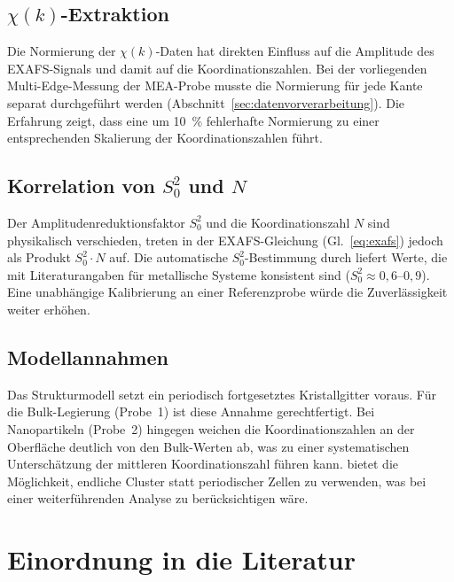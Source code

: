 \subsection{$\chi(k)$-Extraktion}

Die Normierung der $\chi(k)$-Daten hat direkten Einfluss auf die
Amplitude des EXAFS-Signals und damit auf die Koordinationszahlen.
Bei der vorliegenden Multi-Edge-Messung der MEA-Probe musste die
Normierung für jede Kante separat durchgeführt werden
(Abschnitt~\ref{sec:datenvorverarbeitung}).
Die Erfahrung zeigt, dass eine um \SI{10}{\percent} fehlerhafte
Normierung zu einer entsprechenden Skalierung der
Koordinationszahlen führt.

\subsection{Korrelation von $S_0^2$ und $N$}

Der Amplitudenreduktionsfaktor $S_0^2$ und die Koordinationszahl $N$
sind physikalisch verschieden, treten in der EXAFS-Gleichung
(Gl.~\eqref{eq:exafs}) jedoch als Produkt $S_0^2 \cdot N$ auf.
Die automatische $S_0^2$-Bestimmung durch \evax{} liefert Werte, die
mit Literaturangaben für metallische Systeme konsistent sind
($S_0^2 \approx 0{,}6$--$0{,}9$).
Eine unabhängige Kalibrierung an einer Referenzprobe würde die
Zuverlässigkeit weiter erhöhen.

\subsection{Modellannahmen}

Das Strukturmodell setzt ein periodisch fortgesetztes Kristallgitter
voraus.
Für die Bulk-Legierung (Probe~1) ist diese Annahme gerechtfertigt.
Bei Nanopartikeln (Probe~2) hingegen weichen die Koordinationszahlen
an der Oberfläche deutlich von den Bulk-Werten ab, was zu einer
systematischen Unterschätzung der mittleren Koordinationszahl
führen kann.
\evax{} bietet die Möglichkeit, endliche Cluster statt periodischer
Zellen zu verwenden, was bei einer weiterführenden Analyse zu
berücksichtigen wäre.

\section{Einordnung in die Literatur}


